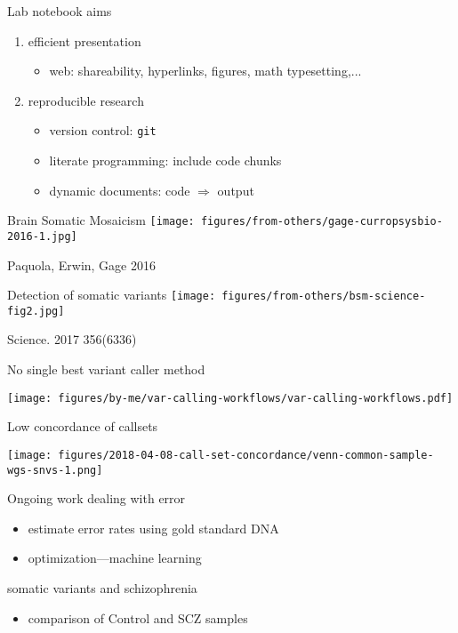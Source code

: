 \documentclass[usenames,dvipsnames]{beamer}
\begin{document}
\begin{frame}{Lab notebook}
aims
\begin{enumerate}
\item efficient presentation 
\begin{itemize}
\item<2> web: shareability, hyperlinks, figures, math typesetting,...
\end{itemize}
\item reproducible research
\begin{itemize}
\item<2> version control: \texttt{git}
\item<2> literate programming: include code chunks
\item<2> dynamic documents: code \(\Rightarrow\) output
\end{itemize}
\end{enumerate}
\end{frame}

\begin{frame}{Brain Somatic Mosaicism}
\texttt{[image: figures/from-others/gage-curropsysbio-2016-1.jpg]}

{\tiny Paquola, Erwin, Gage 2016}
\end{frame}

\begin{frame}{Detection of somatic variants}
\texttt{[image: figures/from-others/bsm-science-fig2.jpg]}

{\tiny Science. 2017 356(6336)}
\end{frame}

\begin{frame}{No single best variant caller method}
\begin{center}
\texttt{[image: figures/by-me/var-calling-workflows/var-calling-workflows.pdf]}
\end{center}
\end{frame}

\begin{frame}{Low concordance of callsets}
\begin{center}
\texttt{[image: figures/2018-04-08-call-set-concordance/venn-common-sample-wgs-snvs-1.png]}
\end{center}
\end{frame}

\begin{frame}{Ongoing work}
dealing with error
\begin{itemize}
\item estimate error rates using gold standard DNA
\item optimization---machine learning
\end{itemize}
\vfill
somatic variants and schizophrenia
\begin{itemize}
\item comparison of Control and SCZ samples
\end{itemize} 
\end{frame}
\end{document}
